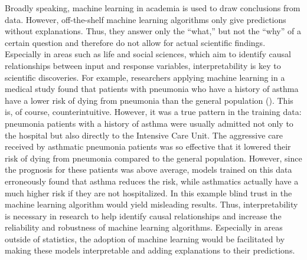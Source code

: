 \documentclass[]{krantz}
\begin{document}
Broadly speaking, machine learning in academia is used to draw
conclusions from data. However, off-the-shelf machine learning
algorithms only give predictions without explanations. Thus, they answer
only the ``what,'' but not the ``why'' of a certain question and
therefore do not allow for actual scientific findings. Especially in
areas such as life and social sciences, which aim to identify causal
relationships between input and response variables, interpretability is
key to scientific discoveries. For example, researchers applying machine
learning in a medical study found that patients with pneumonia who have
a history of asthma have a lower risk of dying from pneumonia than the
general population (\citet{caruana2015intelligible}). This is, of
course, counterintuitive. However, it was a true pattern in the training
data: pneumonia patients with a history of asthma were usually admitted
not only to the hospital but also directly to the Intensive Care Unit.
The aggressive care received by asthmatic pneumonia patients was so
effective that it lowered their risk of dying from pneumonia compared to
the general population. However, since the prognosis for these patients
was above average, models trained on this data erroneously found that
asthma reduces the risk, while asthmatics actually have a much higher
risk if they are not hospitalized. In this example blind trust in the
machine learning algorithm would yield misleading results. Thus,
interpretability is necessary in research to help identify causal
relationships and increase the reliability and robustness of machine
learning algorithms. Especially in areas outside of statistics, the
adoption of machine learning would be facilitated by making these models
interpretable and adding explanations to their predictions.
\end{document}
